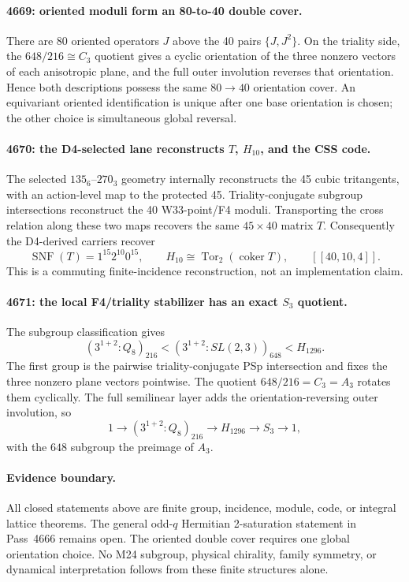 \paragraph{4669: oriented moduli form an 80-to-40 double cover.}
There are 80 oriented operators $J$ above the 40 pairs $\{J,J^2\}$.  On the
triality side, the $648/216\cong C_3$ quotient gives a cyclic orientation of the
three nonzero vectors of each anisotropic plane, and the full outer involution
reverses that orientation.  Hence both descriptions possess the same
$80\to40$ orientation cover.  An equivariant oriented identification is unique
after one base orientation is chosen; the other choice is simultaneous global
reversal.

\paragraph{4670: the D4-selected lane reconstructs $T$, $H_{10}$, and the CSS code.}
The selected $135_6$--$270_3$ geometry internally reconstructs the 45 cubic
tritangents, with an action-level map to the protected 45.  Triality-conjugate
subgroup intersections reconstruct the 40 W33-point/F4 moduli.  Transporting the
cross relation along these two maps recovers the same $45\times40$ matrix $T$.
Consequently the D4-derived carriers recover
\[
 \operatorname{SNF}(T)=1^{15}2^{10}0^{15},\qquad
 H_{10}\cong\operatorname{Tor}_2(\operatorname{coker}T),\qquad
 [[40,10,4]].
\]
This is a commuting finite-incidence reconstruction, not an implementation claim.

\paragraph{4671: the local F4/triality stabilizer has an exact $S_3$ quotient.}
The subgroup classification gives
\[
(3^{1+2}{:}Q_8)_{216}
<
(3^{1+2}{:}SL(2,3))_{648}
<
H_{1296}.
\]
The first group is the pairwise triality-conjugate PSp intersection and fixes the
three nonzero plane vectors pointwise.  The quotient $648/216=C_3=A_3$ rotates
them cyclically.  The full semilinear layer adds the orientation-reversing outer
involution, so
\[
 \boxed{1\to(3^{1+2}{:}Q_8)_{216}\to H_{1296}\to S_3\to1,}
\]
with the $648$ subgroup the preimage of $A_3$.

\paragraph{Evidence boundary.}
All closed statements above are finite group, incidence, module, code, or integral
lattice theorems.  The general odd-$q$ Hermitian 2-saturation statement in
Pass~4666 remains open.  The oriented double cover requires one global orientation
choice.  No M24 subgroup, physical chirality, family symmetry, or dynamical
interpretation follows from these finite structures alone.
